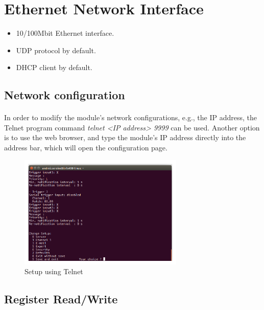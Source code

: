 \documentclass[openany]{article}
\begin{document}
\section{Ethernet Network Interface}

	\begin{itemize}
	\item 10/100Mbit Ethernet interface.
	\item UDP protocol by default.
	\item DHCP client by default.
	\end{itemize}

\etoclocalframed[1]{}

	\subsection{Network configuration}
	
		\paragraph{} In order to modify the module's network configurations, e.g., the IP address, the Telnet program command \emph{telnet {\textless}IP address{\textgreater} 9999} can be used. Another option is to use the web browser, and type the module's IP address directly into the address bar, which will open the configuration page.

		\begin{figure}[!h]
		\caption{Setup using Telnet}
		\label{fig:telnet}
		\centering
		\includegraphics[width=0.7\textwidth]{telnet-image}
		\end{figure}
\FloatBarrier

	\subsection{Register Read/Write}
\end{document}
